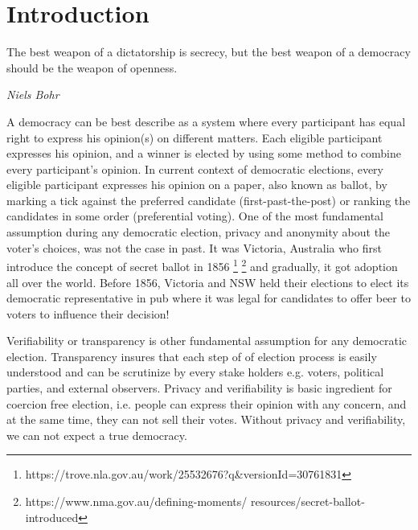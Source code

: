 \chapter{Introduction}
\label{cha:intro}

\epigraph{The best weapon of a dictatorship is secrecy, but the best weapon of a democracy should be the weapon of openness.} 
{\textit{Niels Bohr}} 

%


A democracy can be best describe as a system where every participant 
has equal right to express his opinion(s) on different matters. Each
eligible participant expresses his opinion, and a winner is elected 
by using some method to combine every participant's opinion.
In current context of democratic elections, 
every eligible participant expresses his opinion on a paper, also 
known as ballot, 
by marking a tick against the preferred candidate 
(first-past-the-post) or ranking the candidates in some order
(preferential voting). 
One of the most fundamental assumption during any democratic 
election, privacy and anonymity about the voter's choices, was not the case 
in past. It was Victoria, Australia who first introduce the 
concept of secret ballot in 1856 \footnote{
 https://trove.nla.gov.au/work/25532676?q\&versionId=30761831}
 \footnote{https://www.nma.gov.au/defining-moments/
	  resources/secret-ballot-introduced} and gradually, it 
	  got adoption all over the world. Before 1856, Victoria
	  and NSW held their elections to elect its 
	  democratic representative in pub where it was legal for 
	  candidates to offer beer to voters to influence their 
	  decision! 
	  
Verifiability or transparency is other fundamental assumption for 
any democratic election. Transparency insures that each step of 
of election process is easily understood and can be scrutinize by 
every stake holders e.g. voters, political parties, and external 
observers. Privacy and verifiability  is basic 
ingredient for coercion free election, i.e. people 
can express their opinion with any concern, and at the same time,
they can not sell their votes. Without privacy and verifiability, 
we can not expect a true democracy.   

